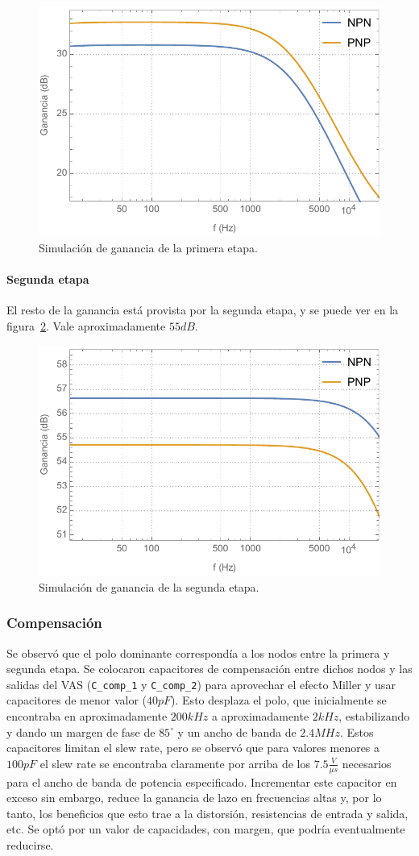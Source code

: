 \documentclass[a4paper,12pt,twoside]{article}
\begin{document}
\begin{figure}[H]
	\centering
	\includegraphics[height=0.4\textwidth]{img/sim/1era-etapa-bode}
	\caption{Simulación de ganancia de la primera etapa.}
	\label{fig:1era-etapa-bode}
\end{figure}

\paragraph{Segunda etapa}

El resto de la ganancia está provista por la segunda etapa, y se puede ver en la figura~\ref{fig:2da-etapa-bode}. Vale aproximadamente $55dB$.

\begin{figure}[H]
	\centering
	\includegraphics[height=0.4\textwidth]{img/sim/2da-etapa-bode}
	\caption{Simulación de ganancia de la segunda etapa.}
	\label{fig:2da-etapa-bode}
\end{figure}


\subsubsection{Compensación}

Se observó que el polo dominante correspondía a los nodos entre la primera y segunda etapa. Se colocaron capacitores de compensación entre dichos nodos y las salidas del VAS (\texttt{C\_comp\_1} y \texttt{C\_comp\_2}) para aprovechar el efecto Miller y usar capacitores de menor valor ($40pF$). Esto desplaza el polo, que inicialmente se encontraba en aproximadamente $200kHz$ a aproximadamente $2kHz$, estabilizando y dando un margen de fase de $85^{\circ}$ y un ancho de banda de $2.4MHz$. Estos capacitores limitan el slew rate, pero se observó que para valores menores a $100pF$ el slew rate se encontraba claramente por arriba de los $7.5\frac{V}{\mu s}$ necesarios para el ancho de banda de potencia especificado. Incrementar este capacitor en exceso sin embargo, reduce la ganancia de lazo en frecuencias altas y, por lo tanto, los beneficios que esto trae a la distorsión, resistencias de entrada y salida, etc. Se optó por un valor de capacidades, con margen, que podría eventualmente reducirse.
\end{document}

